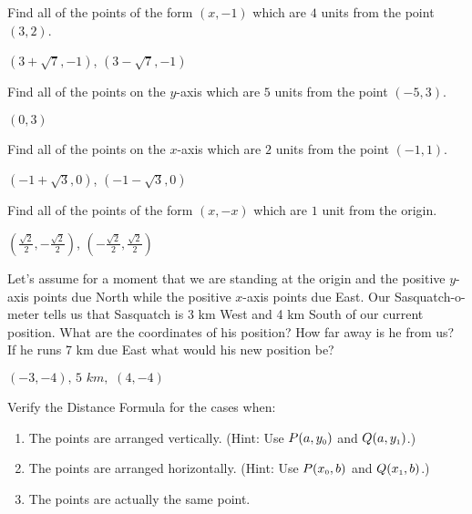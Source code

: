 \begin{enumialphparenastyle}
\begin{multicols}{2}
\begin{ex}
Find all of the points of the form $(x, -1)$ which are $4$ units from the point $(3,2)$.
\begin{sol}
$(3 + \sqrt{7}, -1)$, $(3-\sqrt{7}, -1)$	
\end{sol}	
\end{ex}

\begin{ex}
Find all of the points on the $y$-axis which are $5$ units from the point $(-5,3)$.
\begin{sol}
	$(0,3)$
\end{sol}	
\end{ex}

\begin{ex}
Find all of the points on the $x$-axis which are $2$ units from the point $(-1,1)$.
\begin{sol}
$(-1+\sqrt{3},0)$, $(-1-\sqrt{3},0)$ 	
\end{sol}	
\end{ex}

\begin{ex}
Find all of the points of the form $(x,-x)$ which are $1$ unit from the origin.
\begin{sol}
	$\left(\frac{\sqrt{2}}{2},-\frac{\sqrt{2}}{2} \right)$, $\left(-\frac{\sqrt{2}}{2},\frac{\sqrt{2}}{2}\right)$
\end{sol}	
\end{ex}


\begin{ex}
 Let's assume for a moment that we are standing at the origin and the positive $y$-axis points due North while the positive $x$-axis points due East.  Our Sasquatch-o-meter tells us that Sasquatch is 3 km West and 4 km South of our current position.  What are the coordinates of his position?  How far away is he from us?  If he runs 7 km due East what would his new position be?
 \begin{sol}
 	$(-3,-4), \, 5 \,\, km, \,\, (4, -4)$
 \end{sol}
 \end{ex}	
 
\begin{ex}
Verify the Distance Formula  for the cases when:
 
\begin{enumerate}
 	
 	\item The points are arranged vertically.  (Hint: Use $P(a, y_{\mbox{\tiny$0$}})$ and $Q(a, y_{\mbox{\tiny$1$}})$.)
 	\item The points are arranged horizontally. (Hint: Use $P(x_{\mbox{\tiny$0$}}, b)$ and $Q(x_{\mbox{\tiny$1$}}, b)$.)
 	\item The points are actually the same point. 
 	

\end{enumerate}
\end{ex}
\end{multicols}
\end{enumialphparenastyle}
